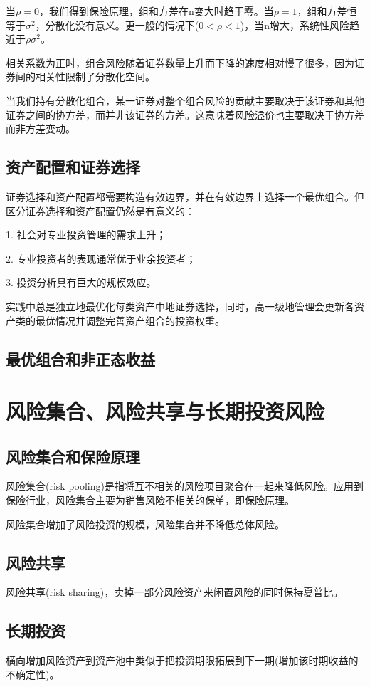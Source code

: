 \documentclass{article}
\begin{document}
当$ \rho=0 $，我们得到保险原理，组和方差在n变大时趋于零。当$ \rho=1 $，组和方差恒等于$ \sigma^2 $，分散化没有意义。更一般的情况下($ 0<\rho<1 $)，当n增大，系统性风险趋近于$ \rho\sigma^2 $。

相关系数为正时，组合风险随着证券数量上升而下降的速度相对慢了很多，因为证券间的相关性限制了分散化空间。

当我们持有分散化组合，某一证券对整个组合风险的贡献主要取决于该证券和其他证券之间的协方差，而并非该证券的方差。这意味着风险溢价也主要取决于协方差而非方差变动。

\subsection{资产配置和证券选择}
证券选择和资产配置都需要构造有效边界，并在有效边界上选择一个最优组合。但区分证券选择和资产配置仍然是有意义的：

1. 社会对专业投资管理的需求上升；

2. 专业投资者的表现通常优于业余投资者；

3. 投资分析具有巨大的规模效应。

实践中总是独立地最优化每类资产中地证券选择，同时，高一级地管理会更新各资产类的最优情况并调整完善资产组合的投资权重。

\subsection{最优组合和非正态收益}

\section{风险集合、风险共享与长期投资风险}
\subsection{风险集合和保险原理}
风险集合(risk pooling)是指将互不相关的风险项目聚合在一起来降低风险。应用到保险行业，风险集合主要为销售风险不相关的保单，即保险原理。

风险集合增加了风险投资的规模，风险集合并不降低总体风险。

\subsection{风险共享}
风险共享(risk sharing)，卖掉一部分风险资产来闲置风险的同时保持夏普比。

\subsection{长期投资}
横向增加风险资产到资产池中类似于把投资期限拓展到下一期(增加该时期收益的不确定性)。
\end{document}
